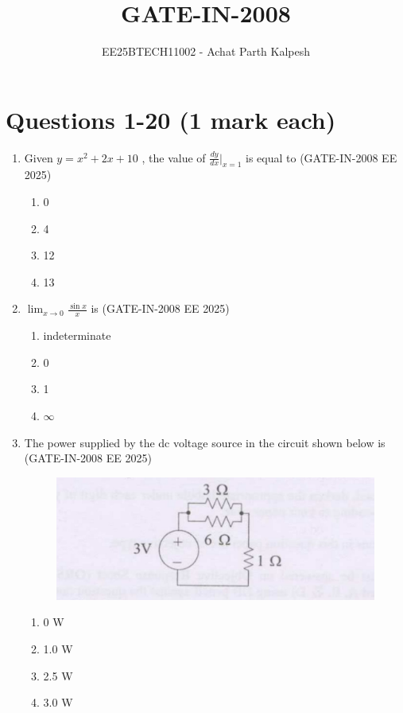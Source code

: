 \documentclass[journal,12pt,onecolumn]{IEEEtran}
\title{GATE-IN-2008}
\author{EE25BTECH11002 - Achat Parth Kalpesh }
\date{}
\theoremstyle{remark}
\begin{document}
\maketitle

\section*{Questions 1-20 (1 mark each)}
\begin{enumerate}[label=Q.\arabic*,start=1]
    \item Given $y = x^2 + 2x + 10$ , the value of $\frac{dy}{dx}\Big|_{x=1}$ is equal to (GATE-IN-2008 EE 2025)
    \begin{enumerate} 
        \item 0
        \item 4 
        \item 12 
        \item 13
    \end{enumerate}
    
    \item $\displaystyle \lim_{x \to 0} \frac{\sin x}{x}$ is (GATE-IN-2008 EE 2025)
    \begin{enumerate} 
        \item indeterminate
        \item  0
        \item  1
        \item $\infty$
    \end{enumerate}
    
    \item  The power supplied by the dc voltage source in the circuit shown below is (GATE-IN-2008 EE 2025)
    
    \begin{figure}[H]
    \centering
    \includegraphics[width=0.5\linewidth]{figs/i1.jpg}
    \label{fig:placeholder1}
\end{figure}
        \begin{enumerate} 
        \item 0 W
        \item 1.0 W
        \item 2.5 W 
        \item 3.0 W
    \end{enumerate}
    

\end{enumerate}
\end{document}
